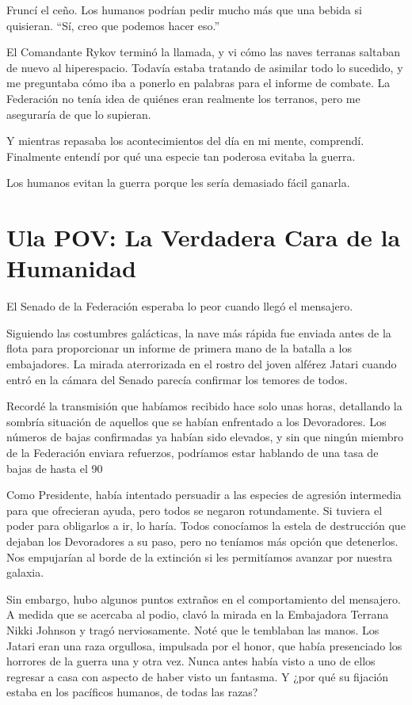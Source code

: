 \documentclass[spanish,12pt,a4paper,oneside,titlepage]{book}
\begin{document}
    Fruncí el ceño. Los humanos podrían pedir mucho más que una bebida si quisieran. ``Sí, creo que podemos hacer eso.''

    El Comandante Rykov terminó la llamada, y vi cómo las naves terranas saltaban de nuevo al hiperespacio. Todavía estaba tratando de asimilar todo lo sucedido, y me preguntaba cómo iba a ponerlo en palabras para el informe de combate. La Federación no tenía idea de quiénes eran realmente los terranos, pero me aseguraría de que lo supieran.

    Y mientras repasaba los acontecimientos del día en mi mente, comprendí. Finalmente entendí por qué una especie tan poderosa evitaba la guerra.

    Los humanos evitan la guerra porque les sería demasiado fácil ganarla.

    \chapter{Ula POV: La Verdadera Cara de la Humanidad}

    El Senado de la Federación esperaba lo peor cuando llegó el mensajero.

    Siguiendo las costumbres galácticas, la nave más rápida fue enviada antes de la flota para proporcionar un informe de primera mano de la batalla a los embajadores. La mirada aterrorizada en el rostro del joven alférez Jatari cuando entró en la cámara del Senado parecía confirmar los temores de todos.

    Recordé la transmisión que habíamos recibido hace solo unas horas, detallando la sombría situación de aquellos que se habían enfrentado a los Devoradores. Los números de bajas confirmadas ya habían sido elevados, y sin que ningún miembro de la Federación enviara refuerzos, podríamos estar hablando de una tasa de bajas de hasta el 90%

    Como Presidente, había intentado persuadir a las especies de agresión intermedia para que ofrecieran ayuda, pero todos se negaron rotundamente. Si tuviera el poder para obligarlos a ir, lo haría. Todos conocíamos la estela de destrucción que dejaban los Devoradores a su paso, pero no teníamos más opción que detenerlos. Nos empujarían al borde de la extinción si les permitíamos avanzar por nuestra galaxia.

    Sin embargo, hubo algunos puntos extraños en el comportamiento del mensajero. A medida que se acercaba al podio, clavó la mirada en la Embajadora Terrana Nikki Johnson y tragó nerviosamente. Noté que le temblaban las manos. Los Jatari eran una raza orgullosa, impulsada por el honor, que había presenciado los horrores de la guerra una y otra vez. Nunca antes había visto a uno de ellos regresar a casa con aspecto de haber visto un fantasma. Y ¿por qué su fijación estaba en los pacíficos humanos, de todas las razas?
\end{document}
